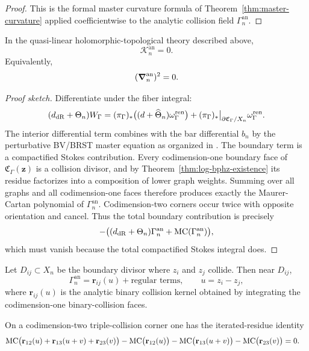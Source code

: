 \begin{proof}
This is the formal master curvature formula of Theorem~\ref{thm:master-curvature} applied coefficientwise to the analytic collision field $\Gamma_n^{\mathrm{an}}$.
\end{proof}

\begin{theorem}%
In the quasi-linear holomorphic-topological theory described above,
\[
 \mathcal K_n^{\mathrm{an}}=0.
\]
Equivalently,
\[
 (\boldsymbol{\nabla}_n^{\mathrm{an}})^2=0.
\]
\end{theorem}

\begin{proof}[Proof sketch]
Differentiate under the fiber integral:
\[
 (d_{\mathrm{dR}}+\Theta_n)W_\Gamma
 =
 (\pi_\Gamma)_*\big((d+\widehat\Theta_n)\omega_\Gamma^{\mathrm{ren}}\big)
 +
 (\pi_\Gamma)_*\big|_{\partial\mathfrak C_\Gamma/X_n}\omega_\Gamma^{\mathrm{ren}}.
\]
The interior differential term combines with the bar differential $b_n$ by the perturbative BV/BRST master equation as organized in \cite{GKW25}. The boundary term is a compactified Stokes contribution. Every codimension-one boundary face of $\mathfrak C_\Gamma(\mathbf z)$ is a collision divisor, and by Theorem~\ref{thm:log-bphz-existence} its residue factorizes into a composition of lower graph weights. Summing over all graphs and all codimension-one faces therefore produces exactly the Maurer-Cartan polynomial of $\Gamma_n^{\mathrm{an}}$. Codimension-two corners occur twice with opposite orientation and cancel. Thus the total boundary contribution is precisely
\[
 -\big((d_{\mathrm{dR}}+\Theta_n)\Gamma_n^{\mathrm{an}}+\mathrm{MC}(\Gamma_n^{\mathrm{an}})\big),
\]
which must vanish because the total compactified Stokes integral does.
\end{proof}

\begin{theorem}%
Let $D_{ij}\subset X_n$ be the boundary divisor where $z_i$ and $z_j$ collide. Then near $D_{ij}$,
\[
 \Gamma_n^{\mathrm{an}} = \mathbf r_{ij}(u)+\text{regular terms},
 \qquad u=z_i-z_j,
\]
where $\mathbf r_{ij}(u)$ is the analytic binary collision kernel obtained by integrating the codimension-one binary-collision faces.

On a codimension-two triple-collision corner one has the iterated-residue identity
\begin{align*}
 &\mathrm{MC}\big(\mathbf r_{12}(u)+\mathbf r_{13}(u+v)+\mathbf r_{23}(v)\big)
 -\mathrm{MC}\big(\mathbf r_{12}(u)\big)
 -\mathrm{MC}\big(\mathbf r_{13}(u+v)\big)
 -\mathrm{MC}\big(\mathbf r_{23}(v)\big)
 =0.
\end{align*}
\end{theorem}

